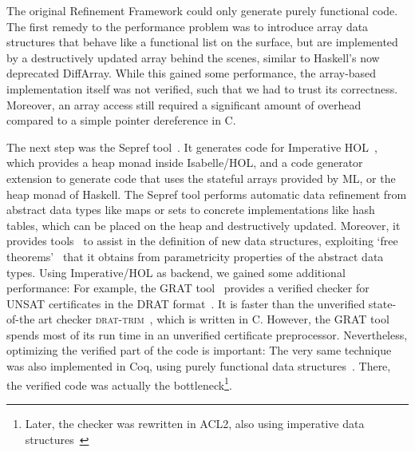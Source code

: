\documentclass[a4paper,oribibl,envcountsame]{llncs}
\begin{document}
The original Refinement Framework could only generate purely functional code. 
The first remedy to the performance problem was to introduce array data structures that behave like a functional 
list on the surface, but are implemented by a destructively updated array behind the scenes, similar to Haskell's now deprecated DiffArray.
While this gained some performance, the array-based implementation itself was not verified, such that we had to trust its correctness. 
Moreover, an array access still required a significant amount of overhead compared to a simple pointer dereference in C.

The next step was the Sepref tool~\cite{La15}. It generates code for Imperative HOL~\cite{BKHEM08}, which provides a heap monad inside Isabelle/HOL, 
and a code generator extension to generate code that uses the stateful arrays provided by ML, or the heap monad of Haskell.
The Sepref tool performs automatic data refinement from abstract data types like maps or sets to concrete implementations like hash tables, which 
can be placed on the heap and destructively updated. 
Moreover, it provides tools~\cite{La16} to assist in the definition of new data structures, exploiting `free theorems'~\cite{Wad89} that it 
obtains from parametricity properties of the abstract data types.
%
Using Imperative/HOL as backend, we gained some additional performance: For example, the GRAT tool~\cite{La17_SAT} provides a 
verified checker for UNSAT certificates in the DRAT format~\cite{WHH14}. It is faster than the unverified state-of-the art 
checker \textsc{drat-trim}~\cite{WHH14}, which is written in C. However, the GRAT tool spends most of its run time in an unverified 
certificate preprocessor. Nevertheless, optimizing the verified part of the code is important: The very same technique was also implemented in Coq,
using purely functional data structures~\cite{CMS17,CHHKS17}. There, the verified code was actually the 
bottleneck\footnote{Later, the checker was rewritten in ACL2, also using imperative data structures~\cite{CHHKS17,HHKW17}}.
\end{document}
